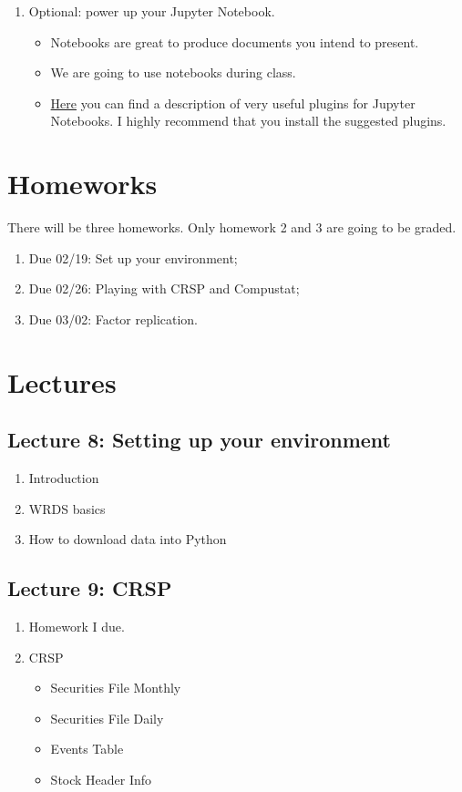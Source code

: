 \documentclass[12pts]{article}
\begin{document}
\begin{enumerate}
	\item Optional: power up your Jupyter Notebook.
	\begin{itemize}
		\item Notebooks are great to produce documents you intend to present.
		\item We are going to use notebooks during class.
		\item \href{https://towardsdatascience.com/bringing-the-best-out-of-jupyter-notebooks-for-data-science-f0871519ca29}{Here} you can find a description of very useful plugins for Jupyter Notebooks. I highly recommend that you install the suggested plugins.  
	\end{itemize}	
\end{enumerate}

\section*{Homeworks}
There will be three homeworks. Only homework 2 and 3 are going to be graded.  
\begin{enumerate}
	\item Due 02/19: Set up your environment;
	\item Due 02/26: Playing with CRSP and Compustat;
	\item Due 03/02: Factor replication.
\end{enumerate}

\section*{Lectures}

\subsection*{Lecture 8: Setting up your environment}
\begin{enumerate}
		\item Introduction
		\item WRDS basics
		\item How to download data into Python
\end{enumerate}

\subsection*{Lecture 9: CRSP}

\begin{enumerate}
	\item Homework I due.
	\item CRSP
	\begin{itemize}
		\item Securities File Monthly 
		\item Securities File Daily 
		\item Events Table
		\item Stock Header Info
	\end{itemize}
\end{enumerate}
\end{document}

